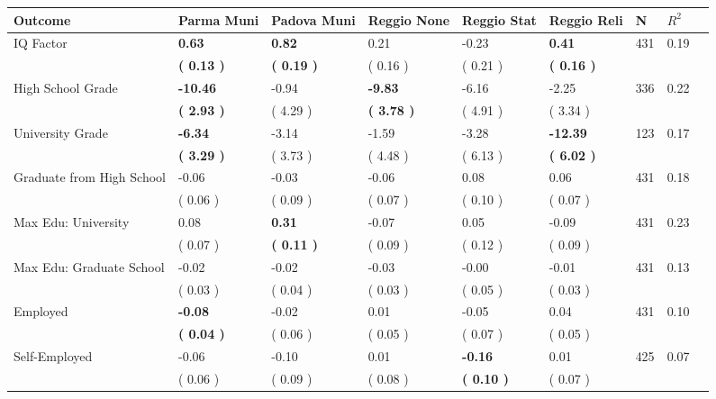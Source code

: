 \begin{tabular}{L{6.2cm} C{1.8cm} C{1.8cm} C{1.8cm} C{1.8cm} C{1.8cm} C{1.8cm} C{0.3cm} C{0.3cm}}
\toprule
 \textbf{Outcome} & \textbf{Parma Muni} & \textbf{Padova Muni} & \textbf{Reggio None} & \textbf{Reggio Stat} & \textbf{Reggio Reli} & \textbf{N} & \textbf{$ R^2$} \\
\midrule
IQ Factor & \textbf{     0.63} & \textbf{     0.82} &      0.21 &     -0.23 & \textbf{     0.41}  & 431 &       0.19 \\ 
 & \textbf{(     0.13 )} & \textbf{(     0.19 )} & (     0.16 ) & (     0.21 ) & \textbf{(     0.16 )}  & \\
High School Grade & \textbf{   -10.46} &     -0.94 & \textbf{    -9.83} &     -6.16 &     -2.25  & 336 &       0.22 \\ 
 & \textbf{(     2.93 )} & (     4.29 ) & \textbf{(     3.78 )} & (     4.91 ) & (     3.34 )  & \\
University Grade & \textbf{    -6.34} &     -3.14 &     -1.59 &     -3.28 & \textbf{   -12.39}  & 123 &       0.17 \\ 
 & \textbf{(     3.29 )} & (     3.73 ) & (     4.48 ) & (     6.13 ) & \textbf{(     6.02 )}  & \\
Graduate from High School &     -0.06 &     -0.03 &     -0.06 &      0.08 &      0.06  & 431 &       0.18 \\ 
 & (     0.06 ) & (     0.09 ) & (     0.07 ) & (     0.10 ) & (     0.07 )  & \\
Max Edu: University &      0.08 & \textbf{     0.31} &     -0.07 &      0.05 &     -0.09  & 431 &       0.23 \\ 
 & (     0.07 ) & \textbf{(     0.11 )} & (     0.09 ) & (     0.12 ) & (     0.09 )  & \\
Max Edu: Graduate School &     -0.02 &     -0.02 &     -0.03 &     -0.00 &     -0.01  & 431 &       0.13 \\ 
 & (     0.03 ) & (     0.04 ) & (     0.03 ) & (     0.05 ) & (     0.03 )  & \\
Employed & \textbf{    -0.08} &     -0.02 &      0.01 &     -0.05 &      0.04  & 431 &       0.10 \\ 
 & \textbf{(     0.04 )} & (     0.06 ) & (     0.05 ) & (     0.07 ) & (     0.05 )  & \\
Self-Employed &     -0.06 &     -0.10 &      0.01 & \textbf{    -0.16} &      0.01  & 425 &       0.07 \\ 
 & (     0.06 ) & (     0.09 ) & (     0.08 ) & \textbf{(     0.10 )} & (     0.07 )  & \\

\end{tabular}

